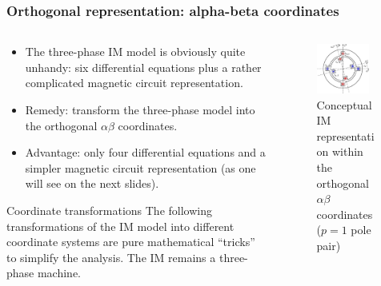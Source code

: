 \begin{frame}
	\frametitle{Orthogonal representation: alpha-beta coordinates}
    \begin{columns}
		\begin{column}{0.55\textwidth}
	       \begin{itemize}
            \item<1-> The three-phase IM model is obviously quite unhandy: six differential equations plus a rather complicated magnetic circuit representation.
            \item<2-> Remedy: transform the three-phase model into the orthogonal $\alpha\beta$ coordinates.
            \item<3-> Advantage: only four differential equations and a simpler magnetic circuit representation (as one will see on the next slides).
           \end{itemize}
           \vspace{-0.4cm}
           \begin{varblock}{Coordinate transformations}
              The following transformations of the IM model into different coordinate systems are pure mathematical ``tricks'' to simplify the analysis. The IM remains a three-phase machine. 
           \end{varblock}
        \end{column}
        \begin{column}{0.45\textwidth}
            \begin{figure}
                \centering
                \includegraphics[width=0.85\textwidth]{fig/lec06/Induction_machine_alpha_beta.pdf}
                \caption{Conceptual IM representation within the orthogonal $\alpha\beta$ coordinates ($p=1$ pole pair)}
                \label{fig:Induction_machine_alpha_beta}
            \end{figure}
        \end{column}
    \end{columns}
\end{frame}

